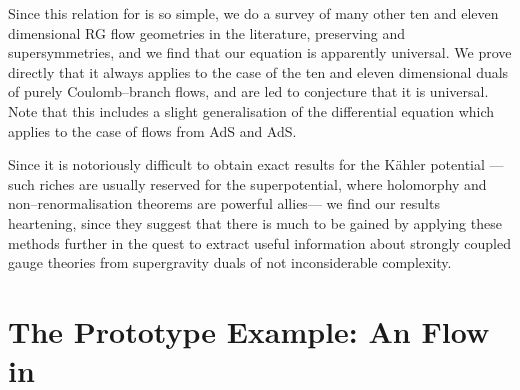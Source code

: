 \documentclass[a4paper,12pt]{article}
\begin{document}
Since this relation for \coordHE{} is so simple, we do a survey of many other
ten and eleven dimensional RG flow geometries in the
literature\cite{pw1,bs2,newwarner}, preserving \coordHE{} and \coordHE{} supersymmetries, and we find that our equation is apparently
universal. We prove directly that it always applies to the case of the
ten and eleven dimensional duals of purely Coulomb--branch
flows\cite{freed2,bakas,bakas2}, and are led to conjecture that it is
universal.  Note that this includes a slight generalisation of the
differential equation which applies to the case of flows from
AdS\coordHE{} and AdS\coordHE{}.

Since it is notoriously difficult to obtain exact \coordHE{} results
for the K\"ahler potential ---such riches are usually reserved for the
superpotential, where holomorphy and non--renormalisation theorems are
powerful allies--- we find our results heartening, since they suggest
that there is much to be gained by applying these methods further in
the quest to extract useful information about strongly coupled gauge
theories from supergravity duals of not inconsiderable complexity.



\section{The Prototype Example: An \coordHE{}  Flow in \coordHE{}  }
\end{document}
